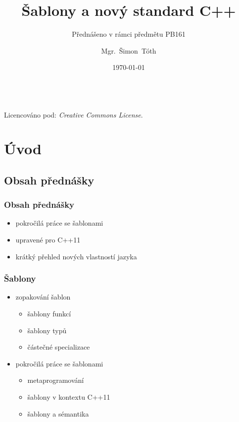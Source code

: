 

\title{Šablony a nový standard C++}
\subtitle{Přednášeno v rámci předmětu PB161}
\author[]{Mgr.~Šimon~Tóth}
\date{\today}

\newcommand{\CcNote}[1]{%
        Licencováno pod: \textit{Creative Commons #1 3.0 License}.%
}



\begin{frame}
\titlepage
	\vfill
	\begin{center}
		\\ {\tiny\CcNote{\CcLongnameByNcSa}}
		\vspace*{2ex}
	\end{center}
\end{frame}

\section{Úvod}
\subsection{Obsah přednášky}

\begin{frame} \frametitle{Obsah přednášky}
	\begin{itemize}
		\item{pokročilá práce se šablonami} \pause
		\item{upravené pro C++11} \pause
		\item{krátký přehled nových vlastností jazyka}
	\end{itemize}
\end{frame}

\begin{frame} \frametitle{Šablony}
	\begin{itemize}
		\item{zopakování šablon}
		\begin{itemize}
			\item{šablony funkcí}
			\item{šablony typů}
			\item{částečné specializace}
		\end{itemize}
		\item{pokročilá práce se šablonami}
		\begin{itemize}
			\item{metaprogramování}
			\item{šablony v kontextu C++11}
			\item{šablony a sémantika}
		\end{itemize}
	\end{itemize}
\end{frame}

